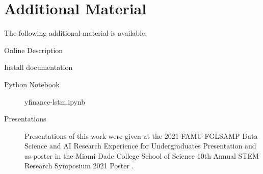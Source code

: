 \documentclass[sigconf]{acmart}
\begin{document}
\appendix

\section{Additional Material}

The following additional material is available:

\begin{description}

\item[Online Description] \cite{c14}

\item[Install documentation] \cite{c12}

\item[Python Notebook] yfinance-lstm.ipynb \cite{c13}

\item[Presentations] 
Presentations of this work were given at the
2021 FAMU-FGLSAMP Data Science and AI Research Experience for Undergraduates Presentation \cite{c15}
and as poster in the Miami Dade College School of Science 10th Annual STEM Research Symposium 2021 Poster \cite{c16}.

\end{description}
\end{document}
